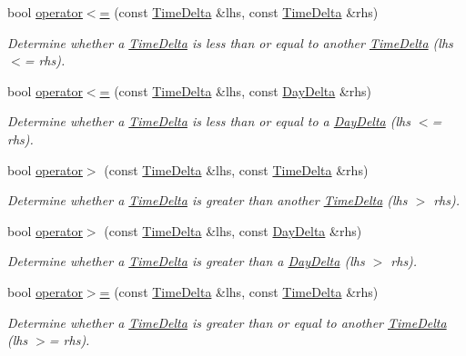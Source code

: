 \begin{DoxyCompactItemize}
bool \hyperlink{structTimeDelta_af313f41f00c31292ebf02d238270f925}{operator$<$=} (const \hyperlink{structTimeDelta}{Time\-Delta} \&lhs, const \hyperlink{structTimeDelta}{Time\-Delta} \&rhs)
\begin{DoxyCompactList}\small\item\em Determine whether a \hyperlink{structTimeDelta}{Time\-Delta} is less than or equal to another \hyperlink{structTimeDelta}{Time\-Delta} (lhs $<$= rhs). \end{DoxyCompactList}\item 
bool \hyperlink{structTimeDelta_a11496cca736a26c79aca03af4306dc69}{operator$<$=} (const \hyperlink{structTimeDelta}{Time\-Delta} \&lhs, const \hyperlink{structDayDelta}{Day\-Delta} \&rhs)
\begin{DoxyCompactList}\small\item\em Determine whether a \hyperlink{structTimeDelta}{Time\-Delta} is less than or equal to a \hyperlink{structDayDelta}{Day\-Delta} (lhs $<$= rhs). \end{DoxyCompactList}\item 
bool \hyperlink{structTimeDelta_a321108cfb9e3902874cc743d899c4076}{operator$>$} (const \hyperlink{structTimeDelta}{Time\-Delta} \&lhs, const \hyperlink{structTimeDelta}{Time\-Delta} \&rhs)
\begin{DoxyCompactList}\small\item\em Determine whether a \hyperlink{structTimeDelta}{Time\-Delta} is greater than another \hyperlink{structTimeDelta}{Time\-Delta} (lhs $>$ rhs). \end{DoxyCompactList}\item 
bool \hyperlink{structTimeDelta_ae6db6a993ecd8aff24ec194b643845be}{operator$>$} (const \hyperlink{structTimeDelta}{Time\-Delta} \&lhs, const \hyperlink{structDayDelta}{Day\-Delta} \&rhs)
\begin{DoxyCompactList}\small\item\em Determine whether a \hyperlink{structTimeDelta}{Time\-Delta} is greater than a \hyperlink{structDayDelta}{Day\-Delta} (lhs $>$ rhs). \end{DoxyCompactList}\item 
bool \hyperlink{structTimeDelta_a044ffed3fee34cab3b4abaf4869c5c0c}{operator$>$=} (const \hyperlink{structTimeDelta}{Time\-Delta} \&lhs, const \hyperlink{structTimeDelta}{Time\-Delta} \&rhs)
\begin{DoxyCompactList}\small\item\em Determine whether a \hyperlink{structTimeDelta}{Time\-Delta} is greater than or equal to another \hyperlink{structTimeDelta}{Time\-Delta} (lhs $>$= rhs). \end{DoxyCompactList}\item 

\end{DoxyCompactItemize}
